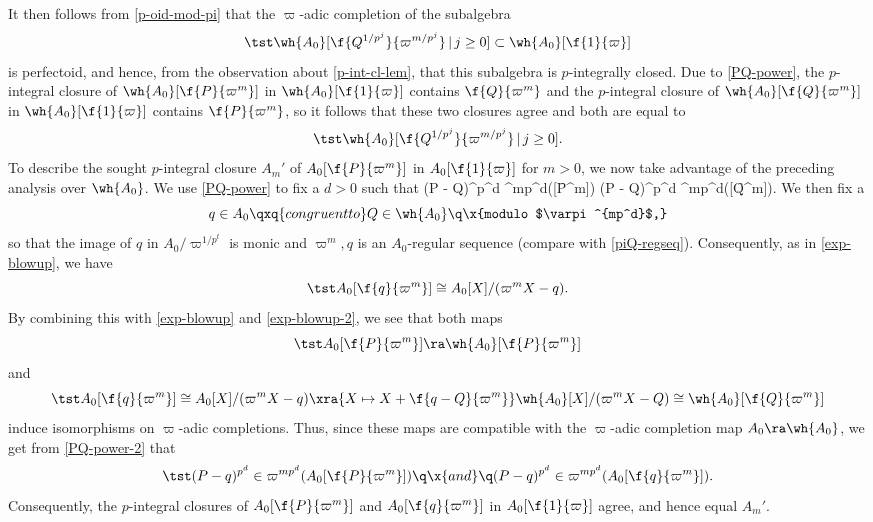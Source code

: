 \ee
It then follows from \eqref{p-oid-mod-pi} that the $\varpi$-adic completion of the subalgebra
\[
\tst \wh{A_0}[\f{Q^{1/p^j}}{\varpi^{m/p^{j}}}\, |\, j \ge 0] \subset \wh{A_0}[\f{1}{\varpi}]
\]
is perfectoid, and hence, from the observation about \eqref{p-int-cl-lem}, that this subalgebra is $p$-integrally closed. Due to \eqref{PQ-power}, the $p$-integral closure of $\wh{A_0}[\f{P}{\varpi^m}]$ in $\wh{A_0}[\f{1}{\varpi}]$ contains $\f{Q}{\varpi^m}$ and the $p$-integral closure of $\wh{A_0}[\f{Q}{\varpi^m}]$ in $\wh{A_0}[\f{1}{\varpi}]$ contains $\f{P}{\varpi^m}$, so it follows that these two closures agree and both are equal to
\[
\tst \wh{A_0}[\f{Q^{1/p^j}}{\varpi^{m/p^{j}}}\, |\, j \ge 0].
\]
To describe the sought $p$-integral closure $A_m'$ of $A_0[\f{P}{\varpi^m}]$ in $A_0[\f{1}{\varpi}]$ for $m > 0$, we now take advantage of the preceding analysis over $\wh{A_0}$. We use \eqref{PQ-power} to fix a $d > 0$ such that
\be \label{PQ-power-2}
\tst (P - Q)^{p^d} \in \varpi^{mp^d}([\f{P}{\varpi^m}]) \q {} \q (P - Q)^{p^d} \in \varpi^{mp^d}([\f{Q}{\varpi^m}]).
\ee
We then fix a
\[
q \in A_0 \qxq{congruent to}  Q \in \wh{A_0} \q \x{modulo $\varpi^{mp^d}$,}
\]
so that the image of $q$ in $A_0/\varpi^{1/p^t}$ is monic and $\varpi^m, q$ is an $A_0$-regular sequence (compare with \eqref{piQ-regseq}). Consequently, as in \eqref{exp-blowup}, we have
\[
\tst A_0[\f{q}{\varpi^m}] \cong A_0[X]/(\varpi^mX - q).
\]
By combining this with \eqref{exp-blowup} and \eqref{exp-blowup-2}, we see that both maps
\[
\tst A_0[\f{P}{\varpi^m}] \ra \wh{A_0}[\f{P}{\varpi^m}]
\]
and
\[
\tst A_0[\f{q}{\varpi^m}] \cong A_0[X]/(\varpi^mX - q) \xra{X \mapsto X + \f{q - Q}{\varpi^m}} \wh{A_0}[X]/(\varpi^mX - Q) \cong \wh{A_0}[\f{Q}{\varpi^m}]
\]
induce isomorphisms on $\varpi$-adic completions. Thus, since these maps are compatible with the $\varpi$-adic completion map $A_0 \ra \wh{A_0}$, we get from \eqref{PQ-power-2} that %
\[
\tst (P - q)^{p^d} \in \varpi^{mp^d}(A_0[\f{P}{\varpi^m}]) \q \x{and} \q (P - q)^{p^d} \in \varpi^{mp^d}(A_0[\f{q}{\varpi^m}]).
\]
Consequently, the $p$-integral closures of $A_0[\f{P}{\varpi^m}]$ and $A_0[\f{q}{\varpi^m}]$ in $A_0[\f{1}{\varpi}]$ agree, and hence equal $A_m'$.

